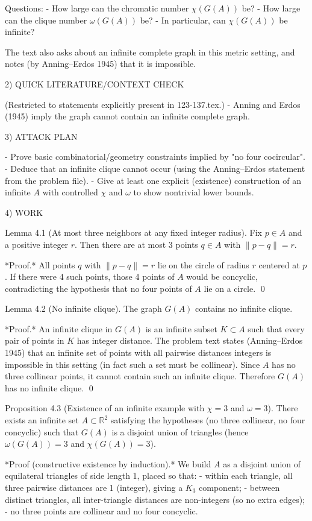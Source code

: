 Questions:
- How large can the chromatic number $\chi(G(A))$ be?
- How large can the clique number $\omega(G(A))$ be?
- In particular, can $\chi(G(A))$ be infinite?

The text also asks about an infinite complete graph in this metric setting, and notes (by Anning--Erdos 1945) that it is impossible.

2) QUICK LITERATURE/CONTEXT CHECK

(Restricted to statements explicitly present in 123-137.tex.)
- Anning and Erdos (1945) imply the graph cannot contain an infinite complete graph.

3) ATTACK PLAN

- Prove basic combinatorial/geometry constraints implied by "no four cocircular".
- Deduce that an infinite clique cannot occur (using the Anning--Erdos statement from the problem file).
- Give at least one explicit (existence) construction of an infinite $A$ with controlled $\chi$ and $\omega$ to show nontrivial lower bounds.

4) WORK

Lemma 4.1 (At most three neighbors at any fixed integer radius).
Fix $p\in A$ and a positive integer $r$.
Then there are at most 3 points $q\in A$ with $\|p-q\|=r$.

*Proof.* All points $q$ with $\|p-q\|=r$ lie on the circle of radius $r$ centered at $p$.
If there were 4 such points, those 4 points of $A$ would be concyclic, contradicting the hypothesis that no four points of $A$ lie on a circle. \qed

Lemma 4.2 (No infinite clique).
The graph $G(A)$ contains no infinite clique.

*Proof.* An infinite clique in $G(A)$ is an infinite subset $K\subset A$ such that every pair of points in $K$ has integer distance.
The problem text states (Anning--Erdos 1945) that an infinite set of points with all pairwise distances integers is impossible in this setting (in fact such a set must be collinear).
Since $A$ has no three collinear points, it cannot contain such an infinite clique.
Therefore $G(A)$ has no infinite clique. \qed

Proposition 4.3 (Existence of an infinite example with $\chi=3$ and $\omega=3$).
There exists an infinite set $A\subset\mathbb{R}^2$ satisfying the hypotheses (no three collinear, no four concyclic) such that $G(A)$ is a disjoint union of triangles (hence $\omega(G(A))=3$ and $\chi(G(A))=3$).

*Proof (constructive existence by induction).* We build $A$ as a disjoint union of equilateral triangles of side length 1, placed so that:
- within each triangle, all three pairwise distances are 1 (integer), giving a $K_3$ component;
- between distinct triangles, all inter-triangle distances are non-integers (so no extra edges);
- no three points are collinear and no four concyclic.


